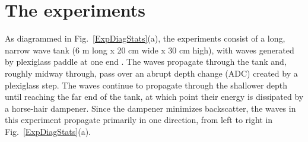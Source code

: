 \documentclass[11pt]{article}
\begin{document}

\section{The experiments}
\label{experiments}

	As diagrammed in Fig.~\ref{ExpDiagStats}(a), the experiments consist of a long, narrow wave tank (6 m long x 20 cm wide x 30 cm high), with waves generated by plexiglass paddle at one end \cite{bolles2019}. The waves propagate through the tank and, roughly midway through, pass over an abrupt depth change (ADC) created by a plexiglass step. The waves continue to propagate through the shallower depth until reaching the far end of the tank, at which point their energy is dissipated by a horse-hair dampener. Since the dampener minimizes backscatter, the waves in this experiment propagate primarily in one direction, from left to right in Fig.~\ref{ExpDiagStats}(a). 
\end{document}
